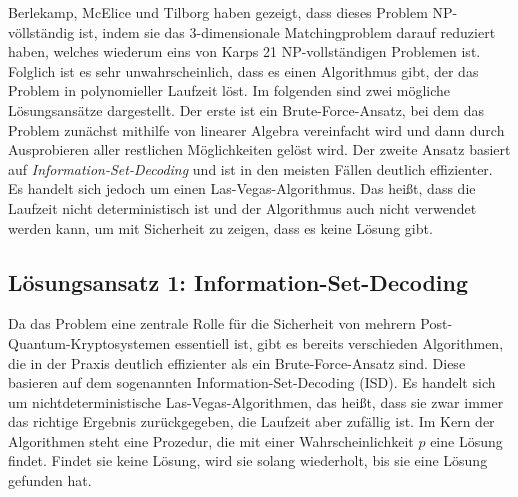 \documentclass[a4paper,10pt,ngerman]{scrartcl}
\begin{document}
Berlekamp, McElice und Tilborg \cite{berlekampInherentIntractabilityCertain1978} haben gezeigt, dass dieses Problem NP-völlständig ist, indem sie das 3-dimensionale Matchingproblem darauf reduziert haben, welches wiederum eins von Karps 21 NP-vollständigen Problemen ist.
Folglich ist es sehr unwahrscheinlich, dass es einen Algorithmus gibt, der das Problem in polynomieller Laufzeit löst. 
Im folgenden sind zwei mögliche Lösungsansätze dargestellt. 
Der erste ist ein Brute-Force-Ansatz, bei dem das Problem zunächst mithilfe von linearer Algebra vereinfacht wird und dann durch Ausprobieren aller restlichen Möglichkeiten gelöst wird.
Der zweite Ansatz basiert auf \textit{Information-Set-Decoding} und ist in den meisten Fällen deutlich effizienter. Es handelt sich jedoch um einen Las-Vegas-Algorithmus. 
Das heißt, dass die Laufzeit nicht deterministisch ist und der Algorithmus auch nicht verwendet werden kann, um mit Sicherheit zu zeigen, dass es keine Lösung gibt. 

\subsection{Lösungsansatz 1: Information-Set-Decoding}
Da das Problem eine zentrale Rolle für die Sicherheit von mehrern Post-Quantum-Kryptosystemen essentiell ist, gibt es bereits verschieden Algorithmen, die in der Praxis deutlich effizienter als ein Brute-Force-Ansatz sind. 
Diese basieren auf dem sogenannten Information-Set-Decoding (ISD). 
Es handelt sich um nichtdeterministische Las-Vegas-Algorithmen, das heißt, dass sie zwar immer das richtige Ergebnis zurückgegeben, die Laufzeit aber zufällig ist. 
Im Kern der Algorithmen steht eine Prozedur, die mit einer Wahrscheinlichkeit $p$ eine Lösung findet. Findet sie keine Lösung, wird sie solang wiederholt, bis sie eine Lösung gefunden hat. 
\end{document}
